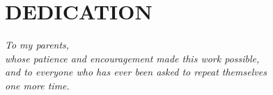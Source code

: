 \chapter*{DEDICATION}

\vspace*{2.5cm}
\begin{center}
\emph{To my parents,}\\[0.3cm]
\emph{whose patience and encouragement made this work possible,}\\[0.6cm]
\emph{and to everyone who has ever been asked to repeat themselves\\
one more time.}
\end{center}
\clearpage
